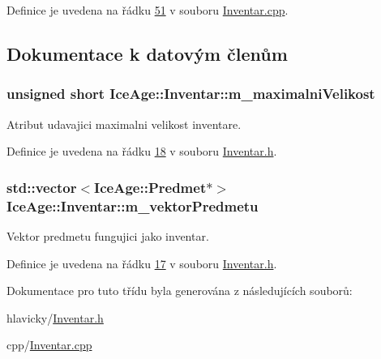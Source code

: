Definice je uvedena na řádku \hyperlink{Inventar_8cpp_source_l00051}{51} v souboru \hyperlink{Inventar_8cpp_source}{Inventar.\+cpp}.



\subsection{Dokumentace k datovým členům}
\subsubsection[{\texorpdfstring{m\+\_\+maximalni\+Velikost}{m_maximalniVelikost}}]{\setlength{\rightskip}{0pt plus 5cm}unsigned short Ice\+Age\+::\+Inventar\+::m\+\_\+maximalni\+Velikost\hspace{0.3cm}{\ttfamily [protected]}}\hypertarget{classIceAge_1_1Inventar_ad45fb3c8b53eb431f3e212e5951b4623}{}\label{classIceAge_1_1Inventar_ad45fb3c8b53eb431f3e212e5951b4623}


Atribut udavajici maximalni velikost inventare. 



Definice je uvedena na řádku \hyperlink{Inventar_8h_source_l00018}{18} v souboru \hyperlink{Inventar_8h_source}{Inventar.\+h}.

\subsubsection[{\texorpdfstring{m\+\_\+vektor\+Predmetu}{m_vektorPredmetu}}]{\setlength{\rightskip}{0pt plus 5cm}std\+::vector$<${\bf Ice\+Age\+::\+Predmet}$\ast$$>$ Ice\+Age\+::\+Inventar\+::m\+\_\+vektor\+Predmetu\hspace{0.3cm}{\ttfamily [protected]}}\hypertarget{classIceAge_1_1Inventar_a0cceae841e70c3db31b3331d4eb075ba}{}\label{classIceAge_1_1Inventar_a0cceae841e70c3db31b3331d4eb075ba}


Vektor predmetu fungujici jako inventar. 



Definice je uvedena na řádku \hyperlink{Inventar_8h_source_l00017}{17} v souboru \hyperlink{Inventar_8h_source}{Inventar.\+h}.



Dokumentace pro tuto třídu byla generována z následujících souborů\+:\begin{DoxyCompactItemize}
\item 
hlavicky/\hyperlink{Inventar_8h}{Inventar.\+h}\item 
cpp/\hyperlink{Inventar_8cpp}{Inventar.\+cpp}\end{DoxyCompactItemize}
